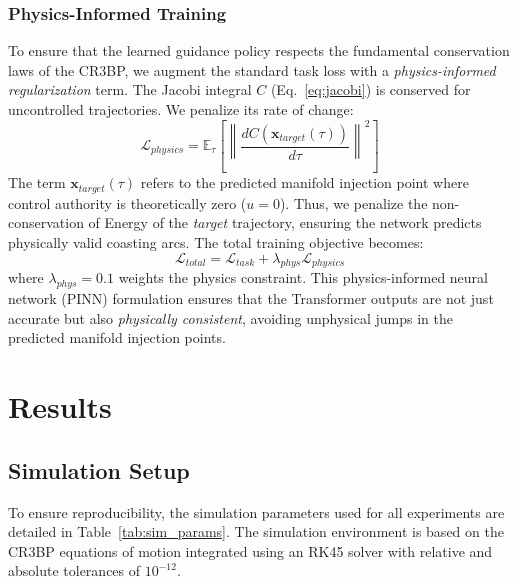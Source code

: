 \documentclass[10pt,letterpaper]{article}
\begin{document}
\subsubsection{Physics-Informed Training}
To ensure that the learned guidance policy respects the fundamental conservation laws of the CR3BP, we augment the standard task loss with a \textit{physics-informed regularization} term. The Jacobi integral $C$ (Eq.~\ref{eq:jacobi}) is conserved for uncontrolled trajectories. We penalize its rate of change:
\begin{equation}
    \mathcal{L}_{physics} = \mathbb{E}_{\tau} \left[ \left\| \frac{dC(\mathbf{x}_{target}(\tau))}{d\tau} \right\|^2 \right]
\end{equation}
The term $\mathbf{x}_{target}(\tau)$ refers to the predicted manifold injection point where control authority is theoretically zero ($u=0$). Thus, we penalize the non-conservation of Energy of the \textit{target} trajectory, ensuring the network predicts physically valid coasting arcs.
The total training objective becomes:
\begin{equation}
    \mathcal{L}_{total} = \mathcal{L}_{task} + \lambda_{phys} \mathcal{L}_{physics}
\end{equation}
where $\lambda_{phys} = 0.1$ weights the physics constraint. This physics-informed neural network (PINN) formulation ensures that the Transformer outputs are not just accurate but also \textit{physically consistent}, avoiding unphysical jumps in the predicted manifold injection points.

\section{Results}

\subsection{Simulation Setup}
To ensure reproducibility, the simulation parameters used for all experiments are detailed in Table~\ref{tab:sim_params}. The simulation environment is based on the CR3BP equations of motion integrated using an RK45 solver with relative and absolute tolerances of $10^{-12}$.
\end{document}
